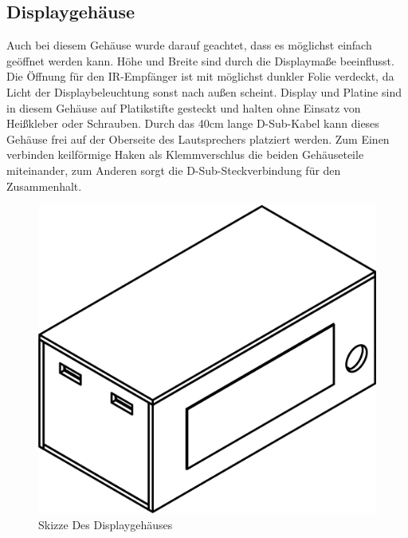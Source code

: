 \documentclass[11pt, titlepage]{report}
\begin{document}
			\subsection{Displaygehäuse}
				Auch bei diesem Gehäuse wurde darauf geachtet, dass es möglichst einfach geöffnet werden kann. Höhe und Breite sind durch die Displaymaße beeinflusst. Die Öffnung für den IR-Empfänger ist mit möglichst dunkler Folie verdeckt, da Licht der Displaybeleuchtung sonst nach außen scheint. Display und Platine sind in diesem Gehäuse auf Platikstifte gesteckt und halten ohne Einsatz von Heißkleber oder Schrauben. Durch das 40cm lange D-Sub-Kabel kann dieses Gehäuse frei auf der Oberseite des Lautsprechers platziert werden. Zum Einen verbinden keilförmige Haken als Klemmverschlus die beiden Gehäuseteile miteinander, zum Anderen sorgt die D-Sub-Steckverbindung für den Zusammenhalt.
				\vspace{3em}
				\begin{figure}[htbp]
					\centering
					\includegraphics[width=0.75\linewidth]{./img/Display_Case_Draw.png}
					\caption{Skizze Des Displaygehäuses
					\label{fig:imgDisplayDraw}}			
				\end{figure}
			\newpage
\end{document}
